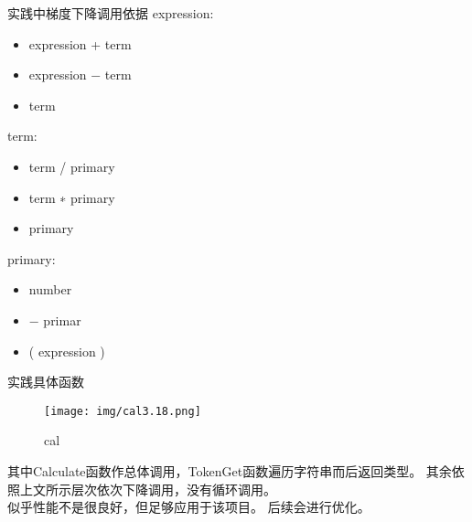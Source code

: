 \documentclass[10pt]{beamer}
\begin{document}
\begin{frame}{实践中梯度下降调用依据}
    expression:
    \begin{itemize}
        \item expression + term
        \item expression − term
        \item term
    \end{itemize}

    term:
    \begin{itemize}
        \item term / primary
        \item term ∗ primary
        \item primary
    \end{itemize}
        
    primary:   
    \begin {itemize}
        \item number
        \item − primar
        \item ( expression )
    \end{itemize}
\end{frame}

\begin{frame}{实践具体函数}
    \begin{figure}[H]
        \centering
        \texttt{[image: img/cal3.18.png]}
        \caption{cal}
        \label{cal3.18}
    \end{figure}
    其中Calculate函数作总体调用，TokenGet函数遍历字符串而后返回类型。
    其余依照上文所示层次依次下降调用，没有循环调用。\\
    似乎性能不是很良好，但足够应用于该项目。
    后续会进行优化。\\
\end{frame}
\end{document}
